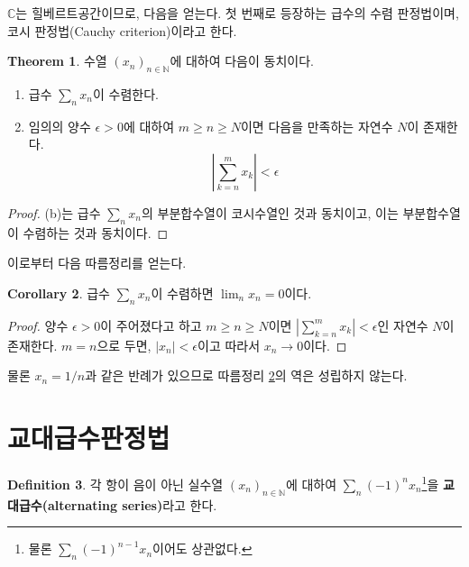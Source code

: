 \documentclass[11pt]{book}
\numberwithin{equation}{chapter}
\def\NN{\mathbb{N}}
\def\CC{\mathbb{C}}
\def\eps{\epsilon}
\newcommand{\abs}[1]{\left\vert#1\right\vert}
\theoremstyle{definition}
\newtheorem{thm}{Theorem}[section]
\newtheorem{cor}[thm]{Corollary}
\newtheorem{defn}[thm]{Definition}
\begin{document}
\(\CC\)는 힐베르트공간이므로, 다음을 얻는다. 첫 번째로 등장하는 급수의 수렴 판정법이며, 코시 판정법(Cauchy criterion)이라고 한다.

\begin{thm}
    수열 \((x_n)_{n \in \NN}\)에 대하여 다음이 동치이다.
    \begin{enumerate} [label=(\alph*), leftmargin=2\parindent]
        \item
        급수 \(\sum_n x_n\)이 수렴한다.
        \item
        임의의 양수 \(\eps > 0\)에 대하여 \(m \ge n \ge N\)이면 다음을 만족하는 자연수 \(N\)이 존재한다.
        \[
        \abs{\sum_{k=n}^m x_k} < \eps    
        \]
    \end{enumerate}
\end{thm}
\begin{proof}
    (b)는 급수 \(\sum_n x_n\)의 부분합수열이 코시수열인 것과 동치이고, 이는 부분합수열이 수렴하는 것과 동치이다.
\end{proof}

이로부터 다음 따름정리를 얻는다.

\begin{cor} \label{cor 5.1.4}
    급수 \(\sum_n x_n\)이 수렴하면 \(\lim_n x_n = 0\)이다.
\end{cor}
\begin{proof}
    양수 \(\eps > 0\)이 주어졌다고 하고 \(m \ge n \ge N\)이면 \(\abs{\sum_{k=n}^m x_k} < \eps\)인 자연수 \(N\)이 존재한다. \(m = n\)으로 두면, \(\abs{x_n} < \eps\)이고 따라서 \(x_n \to 0\)이다.
\end{proof}

물론 \(x_n = 1/n\)과 같은 반례가 있으므로 따름정리 \ref{cor 5.1.4}의 역은 성립하지 않는다.

\section{교대급수판정법}

\begin{defn}
    각 항이 음이 아닌 실수열 \((x_n)_{n \in \NN}\)에 대하여 \(\sum_n (-1)^n x_n\)\footnote{물론 \(\sum_n (-1)^{n-1} x_n\)이어도 상관없다.}을 \textbf{교대급수(alternating series)}라고 한다.
\end{defn}
\end{document}
